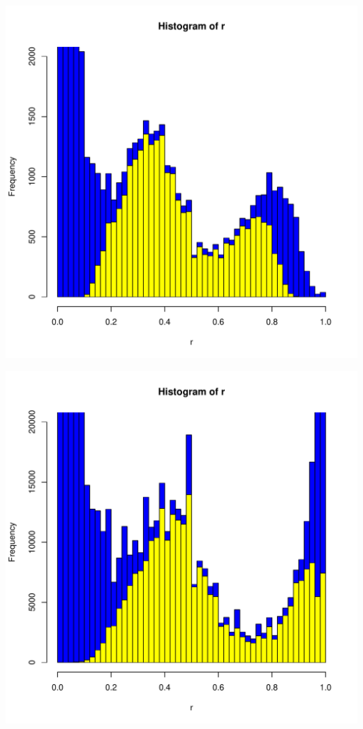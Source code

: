 \documentclass{article}\usepackage[]{graphicx}\usepackage[]{color}
\makeatletter
\def\maxwidth{ %
  \ifdim\Gin@nat@width>\linewidth
    \linewidth
  \else
    \Gin@nat@width
  \fi
}
\newenvironment{knitrout}{}{} %
\makeatother
\begin{document}
\begin{knitrout}
\includegraphics[width=\maxwidth]{FigS7-hwe-histo-figs-knitr/unnamed-chunk-12-4} 

\includegraphics[width=\maxwidth]{FigS7-hwe-histo-figs-knitr/unnamed-chunk-12-5} 


\end{knitrout}
\end{document}
